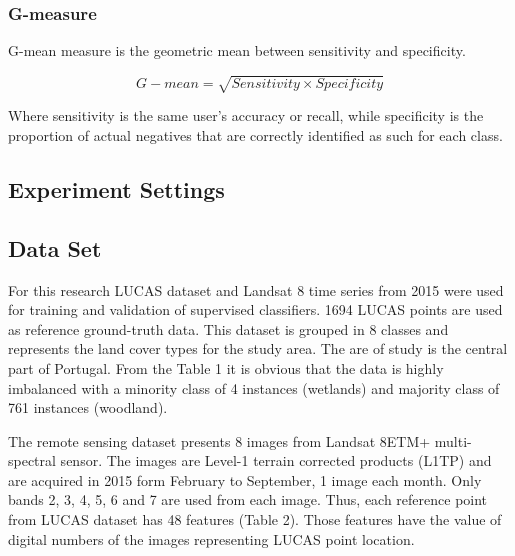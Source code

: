 \documentclass[parskip=full]{scrartcl}
\begin{document}
\subsubsection{G-measure}

G-mean measure is the geometric mean between sensitivity and specificity.

\[G{-}mean = \sqrt{Sensitivity \times Specificity}\]

Where sensitivity is the same user's accuracy or recall, while specificity is
the proportion of actual negatives that are correctly identified as such for
each class.

\subsection{Experiment Settings}

\subsection{Data Set}

For this research LUCAS dataset and Landsat 8 time series from 2015 were used
for training and validation of supervised classifiers. 1694 LUCAS points are
used as reference ground-truth data. This dataset is grouped in 8 classes and
represents the land cover types for the study area. The are  of study is the
central part of Portugal. From the Table 1 it is obvious that the data is
highly imbalanced with a minority class of 4 instances (wetlands) and majority
class of 761 instances (woodland).

The remote sensing dataset presents 8 images from Landsat 8ETM+ multi-spectral
sensor. The images are Level-1 terrain corrected products (L1TP) and are
acquired in 2015 form February to September, 1 image each month. Only bands 2,
3, 4, 5, 6 and 7 are used from each image. Thus, each reference point from
LUCAS dataset has 48 features (Table 2). Those features have the value of
digital numbers of the images representing LUCAS point location.
\end{document}
